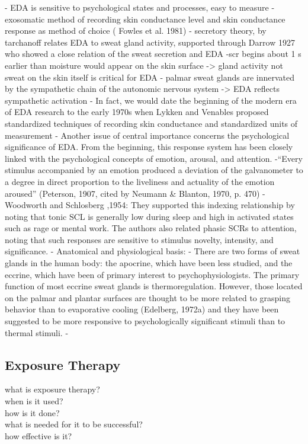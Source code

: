 - EDA is sensitive to psychological states and processes, easy to measure
- exosomatic method of recording skin conductance level and skin conductance response as method of choice ( Fowles et al. 1981)
- secretory theory, by tarchanoff relates EDA to sweat gland activity, supported through Darrow 1927 who showed a close relation of the sweat secretion and EDA
-scr begins about 1 s earlier than moisture would appear on the skin surface -> gland activity not sweat on the skin itself is critical for EDA
- palmar sweat glands are innervated by the sympathetic chain of the autonomic nervous system -> EDA reflects sympathetic activation
- In fact, we would date the beginning of
the modern era of EDA research to the early 1970s when
Lykken and Venables proposed standardized techniques
of recording skin conductance and standardized units of
measurement
- Another issue of central importance concerns the psychological
significance of EDA. From the beginning, this
response system has been closely linked with the psychological
concepts of emotion, arousal, and attention.
-“Every stimulus accompanied by an emotion produced
a deviation of the galvanometer to a degree in direct
proportion to the liveliness and actuality of the emotion
aroused” (Peterson, 1907, cited by Neumann & Blanton,
1970, p. 470)
- Woodworth and Schlosberg ,1954: They supported this indexing relationship by noting that tonic SCL is generally low during sleep and
high in activated states such as rage or mental work. The
authors also related phasic SCRs to attention, noting that
such responses are sensitive to stimulus novelty, intensity,
and significance.
- Anatomical and physiological basis:
- There are two forms of sweat glands in the human
body: the apocrine, which have been less studied, and
the eccrine, which have been of primary interest to psychophysiologists.
The primary function of most eccrine
sweat glands is thermoregulation. However, those located
on the palmar and plantar surfaces are thought to be more
related to grasping behavior than to evaporative cooling
(Edelberg, 1972a) and they have been suggested to be more
responsive to psychologically significant stimuli than to
thermal stimuli.
-

\subsection{Exposure Therapy}
what is exposure therapy?\\ 
when is it used? \\
how is it done?\\
what is needed for it to be successful? \\
how effective is it?\\

